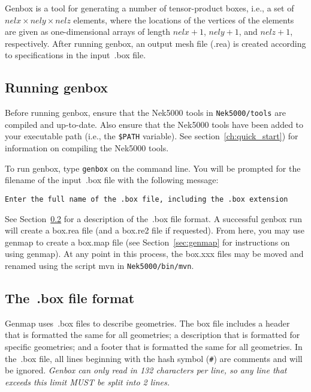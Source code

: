 Genbox is a tool for generating a number of tensor-product boxes, i.e., a set
of \(nelx \times nely \times nelz\) elements, where the locations of the vertices of the
elements are given as one-dimensional arrays of length \(nelx+1\), \(nely+1\), and
\(nelz+1\), respectively.  After running genbox, an output mesh file (.rea) is
created according to specifications in the input~.box file.

\subsection{Running genbox}

Before running genbox, ensure that the Nek5000 tools in {\tt Nek5000/tools}
are compiled and up-to-date.  Also ensure that the Nek5000 tools have been
added to your executable path (i.e., the {\tt \$PATH} variable).  See
section~\ref{ch:quick_start}) for information on compiling the Nek5000 tools.

To run genbox, type {\tt genbox} on the command line.  You will be prompted
for the filename of the input~.box file with the following message:

\begin{verbatim}
Enter the full name of the .box file, including the .box extension
\end{verbatim}

See Section~\ref{sec:box_file} for a description of the~.box file format.  A
successful genbox run will create a box.rea file (and a box.re2 file if
requested).  From here, you may use genmap to create a box.map file (see
Section~\ref{sec:genmap} for instructions on using genmap).  At any point in
this process, the box.xxx files may be moved and renamed using the script mvn
in {\tt Nek5000/bin/mvn}.  

\subsection{The~.box file format}\label{sec:box_file}

Genmap uses~.box files to describe geometries.  The box file includes a header
that is formatted the same for all geometries; a description that is formatted
for specific geometries; and a footer that is formatted the same for all
geometries.  In the~.box file, all lines beginning with the hash symbol
({\tt \#}) are comments and will be ignored.  {\em Genbox can only read
in 132 characters per line, so any line that exceeds this limit MUST be split
into 2 lines.}

